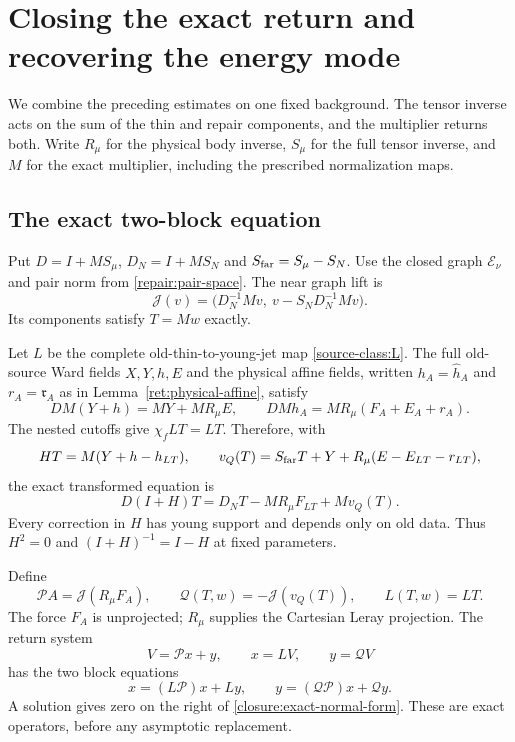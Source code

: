 \section{Closing the exact return and recovering the energy mode}
\label{sec:spectral-assembly}

We combine the preceding estimates on one fixed background. The tensor
inverse acts on the sum of the thin and repair components, and the
multiplier returns both. Write $R_\mu$ for the physical body inverse,
$S_\mu$ for the full tensor inverse, and $M$ for the exact multiplier,
including the prescribed normalization maps.

\subsection{The exact two-block equation}

Put $D=I+MS_\mu$, $D_N=I+MS_N$ and $S_{\rm far}=S_\mu-S_N$.
Use the closed graph $\mathcal E_\nu$ and pair norm from
\eqref{repair:pair-space}. The near graph lift is
\[
 \mathcal J(v)=
 \bigl(D_N^{-1}Mv,\ v-S_ND_N^{-1}Mv\bigr).
\]
Its components satisfy $T=Mw$ exactly.

Let $L$ be the complete old-thin-to-young-jet map
\eqref{source-class:L}. The full old-source Ward fields $X,Y,h,E$
and the physical affine fields, written $h_A=\widehat h_A$ and
$r_A=\mathfrak r_A$ as in Lemma~\ref{ret:physical-affine}, satisfy
\[
 DM(Y+h)=MY+MR_\mu E,\qquad
 DMh_A=MR_\mu(F_A+E_A+r_A).
\]
The nested cutoffs give $\chi_f LT=LT$. Therefore, with
\[
 HT=M(Y+h-h_{LT}),\qquad
 v_Q(T)=S_{\rm far}T+Y+R_\mu(E-E_{LT}-r_{LT}),
\]
the exact transformed equation is
\begin{equation}\label{closure:exact-normal-form}
 D(I+H)T=D_NT-MR_\mu F_{LT}+Mv_Q(T).
\end{equation}
Every correction in $H$ has young support and depends only on old
data. Thus $H^2=0$ and $(I+H)^{-1}=I-H$ at fixed parameters.

Define
\[
 \mathcal P A=\mathcal J(R_\mu F_A),\qquad
 \mathcal Q(T,w)=-\mathcal J(v_Q(T)),\qquad L(T,w)=LT.
\]
The force $F_A$ is unprojected; $R_\mu$ supplies the Cartesian Leray
projection. The return system
\begin{equation}\label{closure:exact-return-system}
 V=\mathcal P x+y,\qquad x=LV,\qquad y=\mathcal QV
\end{equation}
has the two block equations
\[
 x=(L\mathcal P)x+Ly,\qquad
 y=(\mathcal Q\mathcal P)x+\mathcal Qy.
\]
A solution gives zero on the right of
\eqref{closure:exact-normal-form}. These are exact operators, before
any asymptotic replacement.


